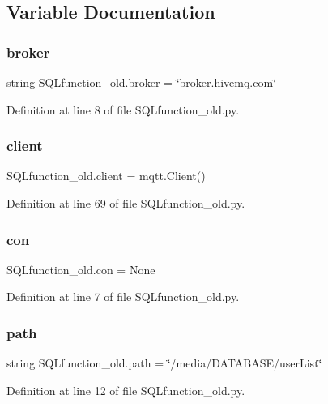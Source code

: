 \subsection{Variable Documentation}
\mbox{\label{namespace_s_q_lfunction__old_a6e92b4071d09fa59ae998b9fd92c5807}} 
\subsubsection{broker}
{\footnotesize\ttfamily string S\+Q\+Lfunction\+\_\+old.\+broker = \char`\"{}broker.\+hivemq.\+com\char`\"{}}



Definition at line 8 of file S\+Q\+Lfunction\+\_\+old.\+py.

\mbox{\label{namespace_s_q_lfunction__old_afd853b9a63374059ab0eabeb24513d09}} 
\subsubsection{client}
{\footnotesize\ttfamily S\+Q\+Lfunction\+\_\+old.\+client = mqtt.\+Client()}



Definition at line 69 of file S\+Q\+Lfunction\+\_\+old.\+py.

\mbox{\label{namespace_s_q_lfunction__old_adb268b8fd9999a94d5ac8b365e7736b3}} 
\subsubsection{con}
{\footnotesize\ttfamily S\+Q\+Lfunction\+\_\+old.\+con = None}



Definition at line 7 of file S\+Q\+Lfunction\+\_\+old.\+py.

\mbox{\label{namespace_s_q_lfunction__old_a6e3ee58e347a0b83dab517fc9fd09ea6}} 
\subsubsection{path}
{\footnotesize\ttfamily string S\+Q\+Lfunction\+\_\+old.\+path = \char`\"{}/media/D\+A\+T\+A\+B\+A\+SE/user\+List\char`\"{}}



Definition at line 12 of file S\+Q\+Lfunction\+\_\+old.\+py.

